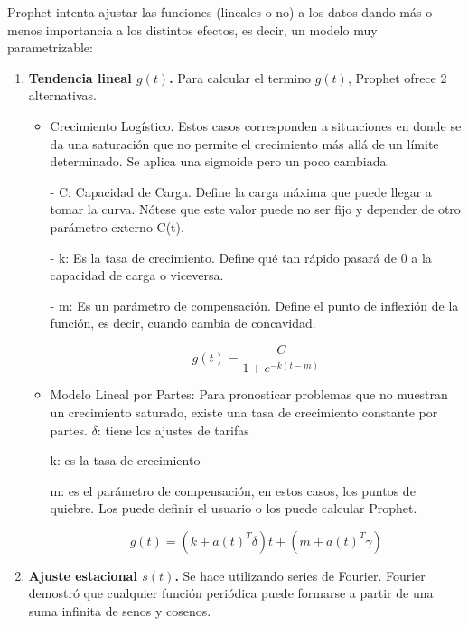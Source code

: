 \documentclass[a4paper,10pt]{article}
\begin{document}
Prophet intenta ajustar las funciones (lineales o no) a los datos dando más o menos importancia a los distintos efectos, es decir, un modelo muy parametrizable:

\begin{enumerate}
 \item \textbf{Tendencia lineal $g(t)$.} Para calcular el termino $g(t)$, Prophet ofrece 2 alternativas.

   \begin{itemize}
    \item Crecimiento Logístico. Estos casos corresponden a situaciones en donde se da una saturación que no permite el crecimiento más allá de un límite determinado. Se aplica una sigmoide pero un poco cambiada.

     - C: Capacidad de Carga. Define la carga máxima que puede llegar a tomar la curva. Nótese que este valor puede no ser fijo y depender de otro parámetro externo C(t).

     - k: Es la tasa de crecimiento. Define qué tan rápido pasará de 0 a la capacidad de carga o viceversa.

     - m: Es un parámetro de compensación. Define el punto de inflexión de la función, es decir, cuando cambia de concavidad.

     \begin{equation}
      g(t) = \frac{C}{1+e^{-k(t-m)}}
     \end{equation}


  \item Modelo Lineal por Partes: Para pronosticar problemas que no muestran un crecimiento saturado, existe una tasa de crecimiento constante por partes.
    $\delta$: tiene los ajustes de tarifas

    k: es la tasa de crecimiento

    m: es el parámetro de compensación, en estos casos, los puntos de quiebre. Los puede definir el usuario o los puede calcular Prophet.

    \begin{equation}
     g(t) = (k+a(t)^T\delta)t + (m+a(t)^T\gamma)
    \end{equation}

  \end{itemize}

 \item \textbf{Ajuste estacional $s(t)$.} Se hace utilizando series de Fourier. Fourier demostró que cualquier función periódica puede formarse a partir de una suma infinita de senos y cosenos.


\end{enumerate}
\end{document}
